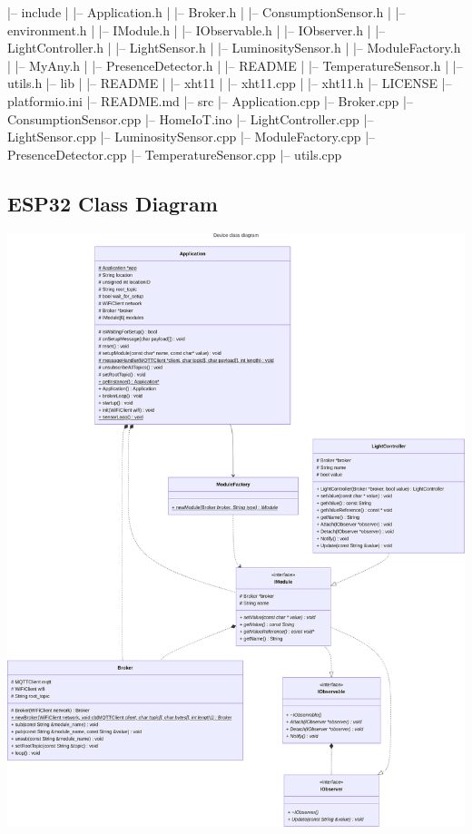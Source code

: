 \documentclass{report}
\begin{document}
            \begin{termbox}
            |-- include
            |   |-- Application.h
            |   |-- Broker.h
            |   |-- ConsumptionSensor.h
            |   |-- environment.h
            |   |-- IModule.h
            |   |-- IObservable.h
            |   |-- IObserver.h
            |   |-- LightController.h
            |   |-- LightSensor.h
            |   |-- LuminositySensor.h
            |   |-- ModuleFactory.h
            |   |-- MyAny.h
            |   |-- PresenceDetector.h
            |   |-- README
            |   |-- TemperatureSensor.h
            |   |-- utils.h
            |-- lib
            |   |-- README
            |   |-- xht11
            |       |-- xht11.cpp
            |       |-- xht11.h
            |-- LICENSE
            |-- platformio.ini
            |-- README.md
            |-- src
               |-- Application.cpp
               |-- Broker.cpp
               |-- ConsumptionSensor.cpp
               |-- HomeIoT.ino
               |-- LightController.cpp
               |-- LightSensor.cpp
               |-- LuminositySensor.cpp
               |-- ModuleFactory.cpp
               |-- PresenceDetector.cpp
               |-- TemperatureSensor.cpp
               |-- utils.cpp
            \end{termbox}

        \subsection{ESP32 Class Diagram}\label{subsec:esp32-class-diagram}

            \includegraphics[width=17cm]{ui/assets/img/esp32-class-diagram}
\end{document}
